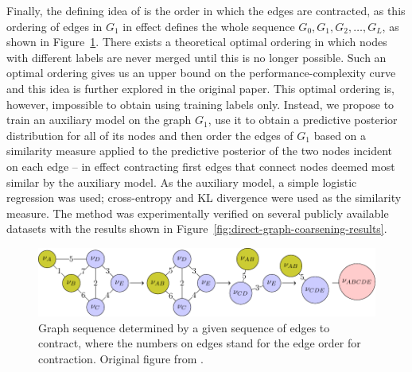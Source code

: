 Finally, the defining idea of \cite{prochazka_scalable_2022} is the order in which the edges are contracted, as this ordering of edges in \( G_1 \) in effect defines the whole sequence \( G_0, G_1, G_2, \dots, G_L \), as shown in Figure~\ref{fig:edge-contraction-sequence}. There exists a theoretical optimal ordering in which nodes with different labels are never merged until this is no longer possible. Such an optimal ordering gives us an upper bound on the performance-complexity curve and this idea is further explored in the original paper. This optimal ordering is, however, impossible to obtain using training labels only. Instead, we propose to train an auxiliary model on the graph \( G_1 \), use it to obtain a predictive posterior distribution for all of its nodes and then order the edges of \( G_1 \) based on a similarity measure applied to the predictive posterior of the two nodes incident on each edge -- in effect contracting first edges that connect nodes deemed most similar by the auxiliary model. As the auxiliary model, a simple logistic regression was used; cross-entropy and KL divergence were used as the similarity measure. The method was experimentally verified on several publicly available datasets with the results shown in Figure~\ref{fig:direct-graph-coarsening-results}.

\begin{figure}
	\includegraphics[width=\linewidth]{images/edge-contraction-sequence/edge-contraction-sequence.pdf}
	\caption{Graph sequence determined by a given sequence of edges to contract, where the numbers on edges stand for the edge order for contraction. Original figure from \cite{prochazka_scalable_2022}.}
	\label{fig:edge-contraction-sequence}
\end{figure}

